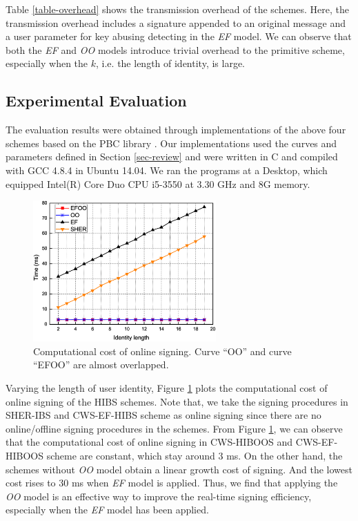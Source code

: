 \documentclass[letter]{ieice}
\begin{document}
Table \ref{table-overhead} shows the transmission overhead of the schemes.
Here, the transmission overhead includes a signature appended to an original message and a user parameter for key abusing detecting in the \emph{EF} model.
We can observe that both the \emph{EF} and \emph{OO} models introduce trivial overhead to the primitive scheme, especially when the $k$, i.e. the length of identity, is large.
\par

\subsection{Experimental Evaluation}
The evaluation results were obtained through implementations of the above four schemes based on the PBC library \cite{pbclib}.
Our implementations used the curves and parameters defined in Section \ref{sec-review} and were written in C and compiled with GCC 4.8.4 in Ubuntu 14.04. 
We ran the programs at a Desktop, which equipped Intel(R) Core Duo CPU i5-3550 at 3.30 GHz and 8G memory. 
\par

\begin{figure}[htbp]
\centering
\includegraphics[width=7cm]{on_sign.eps}
\caption{Computational cost of online signing. Curve ``OO'' and curve ``EFOO'' are almost overlapped.} \label{fig-on-sign}
\end{figure}

Varying the length of user identity, Figure \ref{fig-on-sign} plots the computational cost of online signing of the HIBS schemes.
Note that, we take the signing procedures in SHER-IBS and CWS-EF-HIBS scheme as online signing since there are no online/offline signing procedures in the schemes.
From Figure \ref{fig-on-sign}, we can observe that the computational cost of online signing in CWS-HIBOOS and CWS-EF-HIBOOS scheme are constant, which stay around 3 ms.
On the other hand, the schemes without \emph{OO} model obtain a linear growth cost of signing.
And the lowest cost rises to 30 ms when \emph{EF} model is applied.
Thus, we find that applying the \emph{OO} model is an effective way to improve the real-time signing efficiency, especially when the \emph{EF} model has been applied.
\end{document}
